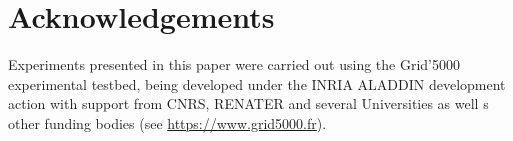 \documentclass[10pt, conference, compsocconf,usletter]{sty/IEEEtran}
\begin{document}
\section*{Acknowledgements}
Experiments presented in this paper were carried out using the Grid'5000
experimental testbed, being developed under the INRIA ALADDIN development
action with support from CNRS, RENATER and several Universities as well
s other funding bodies (see \url{https://www.grid5000.fr}).


\balance

\end{document}
